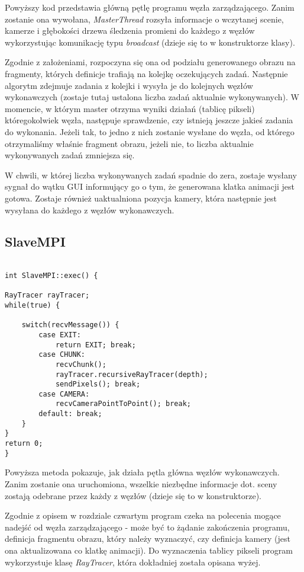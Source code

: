 Powyższy kod przedstawia główną pętlę programu węzła zarządzającego. Zanim zostanie ona wywołana, \emph{MasterThread} rozsyła informacje o wczytanej scenie, kamerze i głębokości drzewa śledzenia promieni do każdego z węzłów wykorzystując komunikację typu \emph{broadcast} (dzieje się to w konstruktorze klasy).

Zgodnie z założeniami, rozpoczyna się ona od podziału generowanego obrazu na fragmenty, których definicje trafiają na kolejkę oczekujących zadań. Następnie algorytm zdejmuje zadania z kolejki i wysyła je do kolejnych węzłów wykonawczych (zostaje tutaj ustalona liczba zadań aktualnie wykonywanych). W momencie, w którym master otrzyma wyniki działań (tablicę pikseli) któregokolwiek węzła, następuje sprawdzenie, czy istnieją jeszcze jakieś zadania do wykonania. Jeżeli tak, to jedno z nich zostanie wysłane do węzła, od którego otrzymaliśmy właśnie fragment obrazu, jeżeli nie, to liczba aktualnie wykonywanych zadań zmniejsza się.

W chwili, w której liczba wykonywanych zadań spadnie do zera, zostaje wysłany sygnał do wątku GUI informujący go o tym, że generowana klatka animacji jest gotowa. Zostaje również uaktualniona pozycja kamery, która następnie jest wysyłana do każdego z węzłów wykonawczych.

\subsection{SlaveMPI}

\begin{lstlisting}[caption={Fragment klasy \emph{SlaveMPI}}]

int SlaveMPI::exec() {

RayTracer rayTracer;
while(true) {

    switch(recvMessage()) {
        case EXIT:
            return EXIT; break;
        case CHUNK:
            recvChunk();
            rayTracer.recursiveRayTracer(depth);
            sendPixels(); break;
        case CAMERA:
            recvCameraPointToPoint(); break;
        default: break;
    }
}
return 0;
}

\end{lstlisting}


Powyższa metoda pokazuje, jak działa pętla główna węzłów wykonawczych. Zanim zostanie ona uruchomiona, wszelkie niezbędne informacje dot. sceny zostają odebrane przez każdy z węzłów (dzieje się to w konstruktorze). 

Zgodnie z opisem w rozdziale czwartym program czeka na polecenia mogące nadejść od węzła zarządzającego - może być to żądanie zakończenia programu, definicja fragmentu obrazu, który należy wyznaczyć, czy definicja kamery (jest ona aktualizowana co klatkę animacji). Do wyznaczenia tablicy pikseli program wykorzystuje klasę \emph{RayTracer}, która dokładniej została opisana wyżej. 

